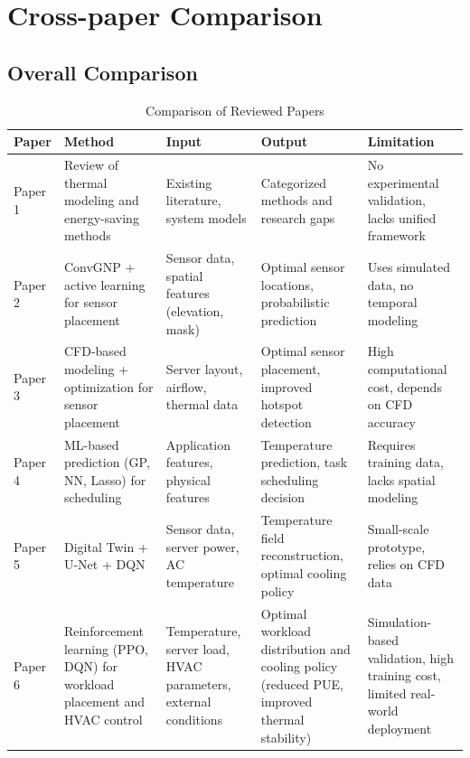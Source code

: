 \documentclass[12pt,a4paper]{article}
\begin{document}
\section{Cross-paper Comparison}

    \subsection{Overall Comparison}
            \begin{table}[H]
                    \centering
                    \small
                    \caption{Comparison of Reviewed Papers}
                        \begin{tabular}{p{2cm} p{3cm} p{3cm} p{3cm} p{3cm}}
                        \toprule
                        Paper & Method & Input & Output & Limitation \\
                        \midrule
                        Paper 1 & Review of thermal modeling and energy-saving methods & Existing literature, system models & Categorized methods and research gaps & No experimental validation, lacks unified framework \\
                        
                        Paper 2 & ConvGNP + active learning for sensor placement & Sensor data, spatial features (elevation, mask) & Optimal sensor locations, probabilistic prediction & Uses simulated data, no temporal modeling \\
                        
                        Paper 3 & CFD-based modeling + optimization for sensor placement & Server layout, airflow, thermal data & Optimal sensor placement, improved hotspot detection & High computational cost, depends on CFD accuracy \\
                        
                        Paper 4 & ML-based prediction (GP, NN, Lasso) for scheduling & Application features, physical features & Temperature prediction, task scheduling decision & Requires training data, lacks spatial modeling \\
                        
                        Paper 5 & Digital Twin + U-Net + DQN & Sensor data, server power, AC temperature & Temperature field reconstruction, optimal cooling policy & Small-scale prototype, relies on CFD data \\
                        
                        Paper 6 & Reinforcement learning (PPO, DQN) for workload placement and HVAC control & Temperature, server load, HVAC parameters, external conditions & Optimal workload distribution and cooling policy (reduced PUE, improved thermal stability) & Simulation-based validation, high training cost, limited real-world deployment \\
                        

\end{tabular}
\end{table}
\end{document}
